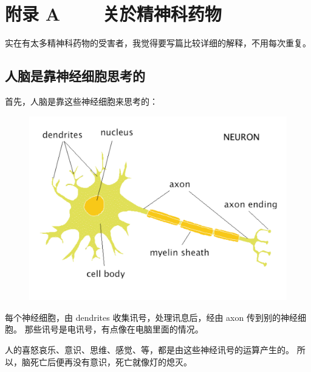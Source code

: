 \documentclass[12pt]{report}
\begin{document}
{\appendix
\renewcommand{\thechapter}{A}
\chapter*{附录 A ~~~ 关於精神科药物}

实在有太多精神科药物的受害者，我觉得要写篇比较详细的解释，不用每次重复。

\section{人脑是靠神经细胞思考的}

首先，人脑是靠这些神经细胞来思考的：
\begin{figure}[H]
\centering
\includegraphics[scale=0.4]{neuron.pdf}
\end{figure}

每个神经细胞，由 dendrites 收集讯号，处理讯息后，经由 axon 传到别的神经细胞。 那些讯号是电讯号，有点像在电脑里面的情况。

人的喜怒哀乐、意识、思维、感觉、等，都是由这些神经讯号的运算产生的。 所以，脑死亡后便再没有意识，死亡就像灯的熄灭。

}
\end{document}
